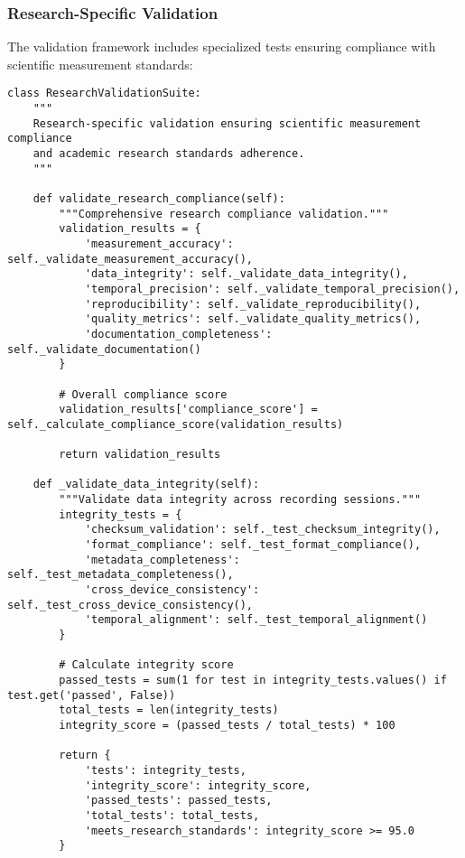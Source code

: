 \documentclass[12pt,a4paper]{article}
\begin{document}
\subsubsection{Research-Specific Validation}

The validation framework includes specialized tests ensuring compliance with scientific measurement standards:

\begin{verbatim}
class ResearchValidationSuite:
    """
    Research-specific validation ensuring scientific measurement compliance
    and academic research standards adherence.
    """
    
    def validate_research_compliance(self):
        """Comprehensive research compliance validation."""
        validation_results = {
            'measurement_accuracy': self._validate_measurement_accuracy(),
            'data_integrity': self._validate_data_integrity(),
            'temporal_precision': self._validate_temporal_precision(),
            'reproducibility': self._validate_reproducibility(),
            'quality_metrics': self._validate_quality_metrics(),
            'documentation_completeness': self._validate_documentation()
        }
        
        # Overall compliance score
        validation_results['compliance_score'] = self._calculate_compliance_score(validation_results)
        
        return validation_results
    
    def _validate_data_integrity(self):
        """Validate data integrity across recording sessions."""
        integrity_tests = {
            'checksum_validation': self._test_checksum_integrity(),
            'format_compliance': self._test_format_compliance(),
            'metadata_completeness': self._test_metadata_completeness(),
            'cross_device_consistency': self._test_cross_device_consistency(),
            'temporal_alignment': self._test_temporal_alignment()
        }
        
        # Calculate integrity score
        passed_tests = sum(1 for test in integrity_tests.values() if test.get('passed', False))
        total_tests = len(integrity_tests)
        integrity_score = (passed_tests / total_tests) * 100
        
        return {
            'tests': integrity_tests,
            'integrity_score': integrity_score,
            'passed_tests': passed_tests,
            'total_tests': total_tests,
            'meets_research_standards': integrity_score >= 95.0
        }
\end{verbatim}
\end{document}
